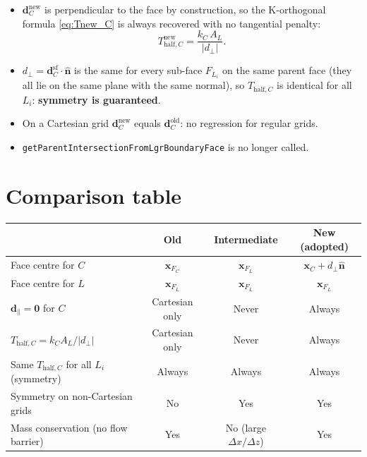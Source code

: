 \documentclass[11pt,a4paper]{article}
\begin{document}
\begin{itemize}
  \item $\mathbf{d}_C^{\text{new}}$ is perpendicular to the face by
        construction, so the K-orthogonal formula \eqref{eq:Tnew_C} is
        always recovered with no tangential penalty:
        \begin{equation*}
          T_{\text{half},C}^{\text{new}} = \frac{k_C\,A_L}{|d_\perp|}.
        \end{equation*}
  \item $d_\perp = \mathbf{d}_C^{\text{sf}}\cdot\hat{\mathbf{n}}$ is
        the same for every sub-face $F_{L_i}$ on the same parent face
        (they all lie on the same plane with the same normal), so
        $T_{\text{half},C}$ is identical for all $L_i$:
        \textbf{symmetry is guaranteed}.
  \item On a Cartesian grid $\mathbf{d}_C^{\text{new}}$ equals
        $\mathbf{d}_C^{\text{old}}$: no regression for regular grids.
  \item \texttt{getParentIntersectionFromLgrBoundaryFace} is no longer
        called.
\end{itemize}

\section{Comparison table}

\begin{center}
\begin{tabular}{lccc}
\toprule
 & \textbf{Old} & \textbf{Intermediate} & \textbf{New (adopted)} \\
\midrule
Face centre for $C$ &
  $\mathbf{x}_{F_C}$ &
  $\mathbf{x}_{F_L}$ &
  $\mathbf{x}_C + d_\perp\hat{\mathbf{n}}$ \\[4pt]
Face centre for $L$ &
  $\mathbf{x}_{F_L}$ &
  $\mathbf{x}_{F_L}$ &
  $\mathbf{x}_{F_L}$ \\[4pt]
$\mathbf{d}_\parallel = \mathbf{0}$ for $C$ &
  Cartesian only &
  Never &
  Always \\[4pt]
$T_{\text{half},C} = k_C A_L / |d_\perp|$ &
  Cartesian only &
  Never &
  Always \\[4pt]
Same $T_{\text{half},C}$ for all $L_i$ (symmetry) &
  Always &
  Always &
  Always \\[4pt]
Symmetry on non-Cartesian grids &
  \textcolor{oldred}{No} &
  \textcolor{newblue}{Yes} &
  \textcolor{newblue}{Yes} \\[4pt]
Mass conservation (no flow barrier) &
  \textcolor{newblue}{Yes} &
  \textcolor{oldred}{No (large $\Delta x/\Delta z$)} &
  \textcolor{newblue}{Yes} \\
\bottomrule
\end{tabular}
\end{center}
\end{document}
